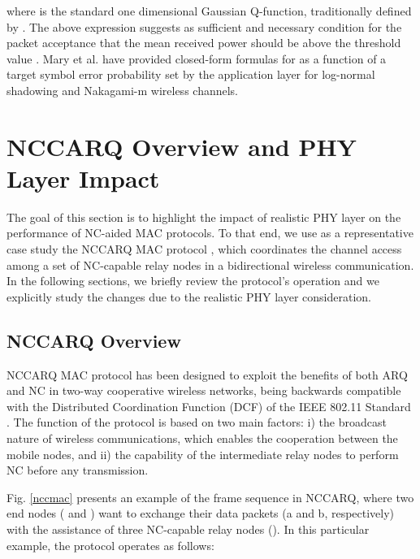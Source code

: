 \documentclass[12pt,draftcls, onecolumn]{IEEEtran}
\begin{document}
where  is the standard one dimensional Gaussian Q-function, traditionally defined by . The above expression suggests as sufficient and necessary condition for the packet acceptance that the mean received power should be above the threshold value . Mary et al. \cite{5288484} have provided closed-form formulas for  as a function of a target symbol error probability set by the application layer for log-normal shadowing and Nakagami-m wireless channels.

\section{NCCARQ Overview and PHY Layer Impact}
\label{sec:impact}

The goal of this section is to highlight the impact of realistic PHY layer on the performance of NC-aided MAC protocols. To that end, we use as a representative case study the NCCARQ MAC protocol \cite{nccarq}, which coordinates the channel access among a set of NC-capable relay nodes in a bidirectional wireless communication. In the following sections, we briefly review the protocol's operation and we explicitly study the changes due to the realistic PHY layer consideration.

\subsection{NCCARQ Overview}
\label{sec:overview}

NCCARQ \cite{nccarq} MAC protocol has been designed to exploit the benefits of both ARQ and NC in two-way cooperative wireless networks, being backwards compatible with the Distributed Coordination Function (DCF) of the IEEE 802.11 Standard \cite{80211}. The function of the protocol is based on two main factors: i) the broadcast nature of wireless communications, which enables the cooperation between the mobile nodes, and ii) the capability of the intermediate relay nodes to perform NC before any transmission.

Fig. \ref{nccmac} presents an example of the frame sequence in NCCARQ, where two end nodes ( and ) want to exchange their data packets (a and b, respectively) with the assistance of three NC-capable relay nodes (). In this particular example, the protocol operates as follows:
\end{document}
